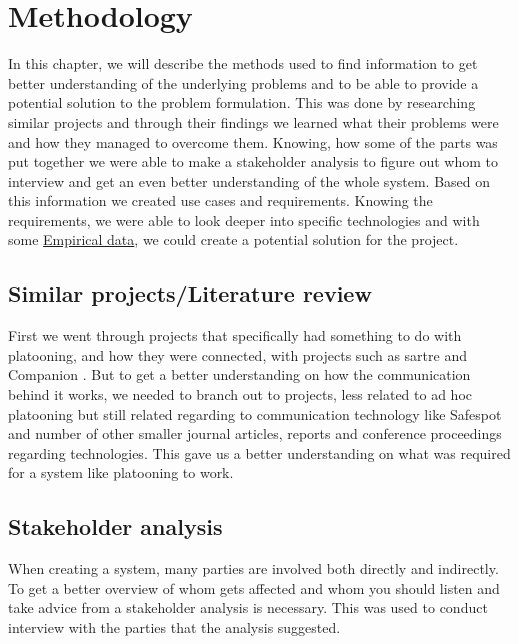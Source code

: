 \section{Methodology}\label{sec:methodology}
% 
In this chapter, we will describe the methods used to find information to get better understanding of the underlying problems and to be able to provide a potential solution to the problem formulation. This was done by researching similar projects and through their findings we learned what their problems were and how they managed to overcome them. Knowing, how some of the parts was put together we were able to make a stakeholder analysis to figure out whom to interview and get an even better understanding of the whole system. Based on this information we created use cases and requirements. Knowing the requirements, we were able to look deeper into specific technologies and with some \hyperref[sec:data]{Empirical data}, we could create a potential solution for the project. 
% 
\subsection{Similar projects/Literature review}
First we went through projects that specifically had something to do with platooning, and how they were connected, with projects such as \acrshort{sartre} \cite{Chan2012ProjectSARTRE} and Companion \cite{2016CompanionProject}. But to get a better understanding on how the communication behind it works, we needed to branch out to projects, less related to ad hoc platooning but still related regarding to communication technology like Safespot \cite{Safespot} and number of other smaller journal articles, reports and conference proceedings regarding technologies. This gave us a better understanding on what was required for a system like platooning to work.
% 
\subsection{Stakeholder analysis}
When creating a system, many parties are involved both directly and indirectly. To get a better overview of whom gets affected and whom you should listen and take advice from a stakeholder analysis is necessary. This was used to conduct interview with the parties that the analysis suggested. 
% 
